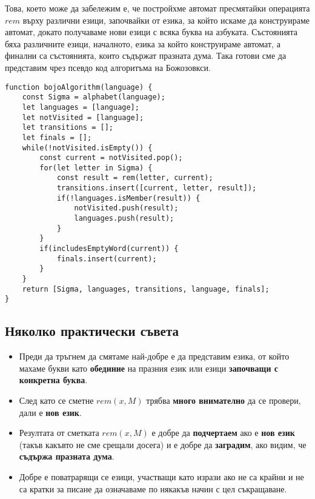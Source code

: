 \documentclass[12pt]{article}
\begin{document}
Това, което може да забележим е, че постройхме автомат пресмятайки операцията \(rem\) върху различни езици,
започвайки от езика, за който искаме да конструираме автомат, докато получаваме нови езици с всяка буква на азбуката.
Състоянията бяха различните езици, началното, езика за който конструираме автомат, а 
финални са състоянията, които съдържат празната дума. Така готови сме да представим чрез псевдо код алгоритъма на Божозовкси. \\

\vspace{2mm}

\begin{lstlisting}[style=ES6]
function bojoAlgorithm(language) {
    const Sigma = alphabet(language);
    let languages = [language];
    let notVisited = [language];
    let transitions = [];
    let finals = [];
    while(!notVisited.isEmpty()) {
        const current = notVisited.pop();
        for(let letter in Sigma) {
            const result = rem(letter, current);
            transitions.insert([current, letter, result]);
            if(!languages.isMember(result)) {
                notVisited.push(result);
                languages.push(result);
            }
        }
        if(includesEmptyWord(current)) {
            finals.insert(current);
        }
    }
    return [Sigma, languages, transitions, language, finals];
}
\end{lstlisting}

\subsection{Няколко практически съвета}

\begin{itemize}
    \item Преди да тръгнем да смятаме най-добре е да представим езика, от който махаме букви като \textbf{обединие} на празния език или езици \textbf{започващи с конкретна буква}.
    \item След като се сметне \(rem(x, M)\) трябва \textbf{много внимателно} да се провери, дали е \textbf{нов език}.
    \item Резултата от сметката \(rem(x, M)\) е добре да \textbf{подчертаем} ако е \textbf{нов език} (такъв какъвто не сме срещали досега) и е добре да \textbf{заградим}, ако видим, че \textbf{съдържа празната дума}.
    \item Добре е поватрарящи се езици, участващи като изрази ако не са крайни и не са кратки за писане да означаваме по някакъв начин с цел съкращаване.
\end{itemize}
\end{document}
